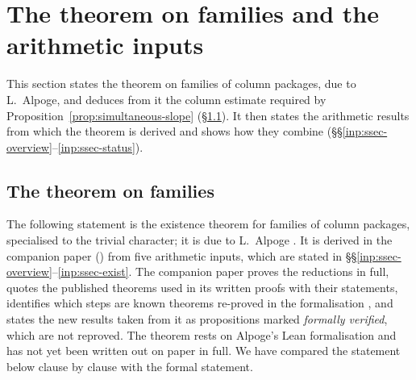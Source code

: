 \documentclass[10pt]{amsart}
\theoremstyle{definition}
\theoremstyle{remark}
\begin{document}
\section{The theorem on families and the arithmetic inputs}\label{sec:inputs}

This section states the theorem on families of column packages, due to
L.~Alpoge, and deduces from it the column estimate required by
Proposition~\ref{prop:simultaneous-slope} (\S\ref{subsec:closing}). It then
states the arithmetic results from which the theorem is derived and shows
how they combine (\S\S\ref{inp:ssec-overview}--\ref{inp:ssec-status}).

\subsection{The theorem on families}\label{subsec:closing}
The following statement is the existence theorem for families of column
packages, specialised to the trivial character; it is due to L.~Alpoge
\cite{CharacterFamily}. It is derived in the companion paper \cite{Annex}
(\cite[Theorem~\ref{A-i4:thm-final}]{Annex}) from five arithmetic inputs, which
are stated in \S\S\ref{inp:ssec-overview}--\ref{inp:ssec-exist}. The
companion paper proves the reductions in full, quotes the published theorems
used in its written proofs with their statements, identifies which steps are
known theorems re-proved in the formalisation \cite{CharacterFamily}, and
states the new results taken from it as propositions marked \emph{formally
verified}, which are not reproved. The theorem rests on Alpoge's Lean
formalisation and has not yet been written out on paper in full. We have
compared the statement below clause by clause with the formal statement.
\end{document}
